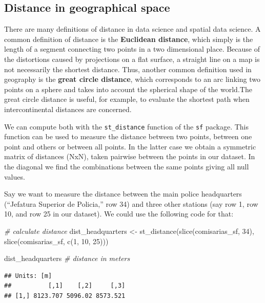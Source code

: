 \documentclass[
]{book}
\newenvironment{Shaded}{\begin{snugshade}}{\end{snugshade}}
\newcommand{\CommentTok}[1]{\textcolor[rgb]{0.56,0.35,0.01}{\textit{#1}}}
\newcommand{\DecValTok}[1]{\textcolor[rgb]{0.00,0.00,0.81}{#1}}
\newcommand{\FunctionTok}[1]{\textcolor[rgb]{0.00,0.00,0.00}{#1}}
\newcommand{\NormalTok}[1]{#1}
\newcommand{\OtherTok}[1]{\textcolor[rgb]{0.56,0.35,0.01}{#1}}
\begin{document}
\hypertarget{distance-in-geographical-space}{%
\subsection{Distance in geographical space}\label{distance-in-geographical-space}}

There are many definitions of distance in data science and spatial data science. A common definition of distance is the \textbf{Euclidean distance}, which simply is the length of a segment connecting two points in a two dimensional place. Because of the distortions caused by projections on a flat surface, a straight line on a map is not necessarily the shortest distance. Thus, another common definition used in geography is the \textbf{great circle distance}, which corresponds to an arc linking two points on a sphere and takes into account the spherical shape of the world.The great circle distance is useful, for example, to evaluate the shortest path when intercontinental distances are concerned.

We can compute both with the \texttt{st\_distance} function of the \texttt{sf} package. This function can be used to measure the distance between two points, between one point and others or between all points. In the latter case we obtain a symmetric matrix of distances (NxN), taken pairwise between the points in our dataset. In the diagonal we find the combinations between the same points giving all null values.

Say we want to measure the distance between the main police headquarters (``Jefatura Superior de Policia,'' row 34) and three other stations (say row 1, row 10, and row 25 in our dataset). We could use the following code for that:

\begin{Shaded}
\begin{Highlighting}[]
\CommentTok{\# calculate distance}
\NormalTok{dist\_headquarters }\OtherTok{\textless{}{-}} \FunctionTok{st\_distance}\NormalTok{(}\FunctionTok{slice}\NormalTok{(comisarias\_sf, }\DecValTok{34}\NormalTok{), }
                              \FunctionTok{slice}\NormalTok{(comisarias\_sf, }\FunctionTok{c}\NormalTok{(}\DecValTok{1}\NormalTok{, }\DecValTok{10}\NormalTok{, }\DecValTok{25}\NormalTok{)))}

\NormalTok{dist\_headquarters }\CommentTok{\# distance in meters}
\end{Highlighting}
\end{Shaded}

\begin{verbatim}
## Units: [m]
##          [,1]    [,2]     [,3]
## [1,] 8123.707 5096.02 8573.521
\end{verbatim}
\end{document}
